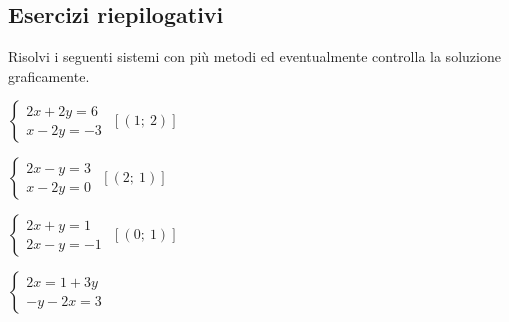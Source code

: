 \subsection{Esercizi riepilogativi}



\begin{esercizio}[*]
 \label{ese:22.67}
 Risolvi i seguenti sistemi con più metodi ed eventualmente controlla
la soluzione graficamente.
\begin{htmulticols}{2}
\begin{enumeratea}
\item \(\left\{\begin{array}{l}{2x+2y=6}\\{x-2y=-3}\end{array}\right.\)
 \hfill \(\left[(1;~2)\right]\)
\item \(\left\{\begin{array}{l}{2x-y=3}\\{x-2y=0}\end{array}\right.\)
 \hfill \(\left[(2;~1)\right]\)
\item \(\left\{\begin{array}{l}2x+y=1 \\2x-y=-1\end{array}\right.\)
 \hfill \(\left[(0;~1)\right]\)
\item \(\left\{\begin{array}{l}2x=1+3y\\-y-2x=3\end{array}\right.\)

\end{enumeratea}
\end{htmulticols}
\end{esercizio}
